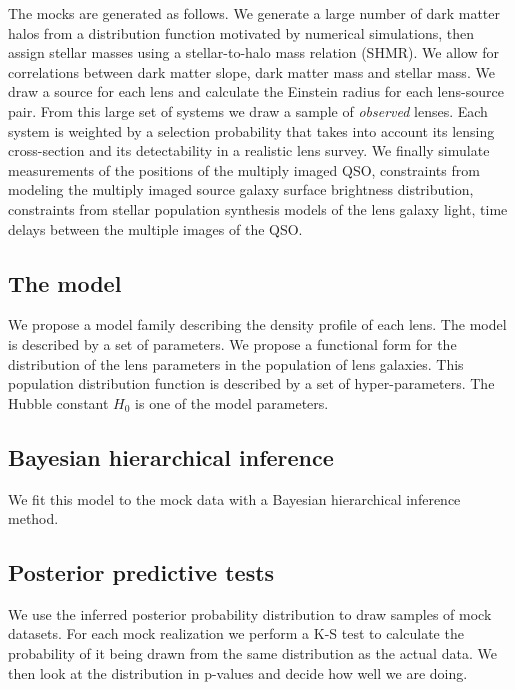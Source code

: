\documentclass[useAMS,usenatbib]{mn2e}
\begin{document}
The mocks are generated as follows.
We generate a large number of dark matter halos from a distribution function motivated by numerical simulations, then assign stellar masses using a stellar-to-halo mass relation (SHMR).
We allow for correlations between dark matter slope, dark matter mass and stellar mass. 
We draw a source for each lens and calculate the Einstein radius for each lens-source pair.
From this large set of systems we draw a sample of {\em observed} lenses. Each system is weighted by a selection probability that takes into account its lensing cross-section and its detectability in a realistic lens survey.
We finally simulate measurements of the positions of the multiply imaged QSO, constraints from modeling the multiply imaged source galaxy surface brightness distribution, constraints from stellar population synthesis models of the lens galaxy light, time delays between the multiple images of the QSO.


\subsection{The model}\label{ssec:model}

We propose a model family describing the density profile of each lens. The model is described by a set of parameters.
We propose a functional form for the distribution of the lens parameters in the population of lens galaxies.
This population distribution function is described by a set of hyper-parameters.
The Hubble constant $H_0$ is one of the model parameters.

\subsection{Bayesian hierarchical inference}
We fit this model to the mock data with a Bayesian hierarchical inference method.



\subsection{Posterior predictive tests}\label{ssec:tests}
We use the inferred posterior probability distribution to draw samples of mock datasets.
For each mock realization we perform a K-S test to calculate the probability of it being drawn from the same distribution as the actual data.
We then look at the distribution in p-values and decide how well we are doing.


\end{document}
